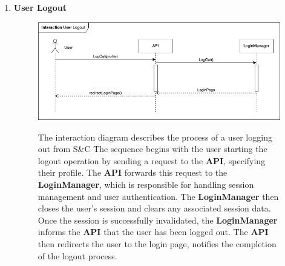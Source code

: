 \begin{enumerate}
    \newpage
    \item \textbf{User Logout}
    \begin{figure}[h!]
            \centering  \includegraphics[width=1\textwidth]{DD/Images/Interactions/INT02_UserLogout.drawio.png}
            \label{fig:ComponentViewDiagram}
            \caption*{The interaction diagram describes the process of a user logging out from S\&C The sequence begins with the user starting the logout operation by sending a request to the \textbf{API}, specifying their profile. The \textbf{API} forwards this request to the \textbf{LoginManager}, which is responsible for handling session management and user authentication. The \textbf{LoginManager} then closes the user's session and clears any associated session data. Once the session is successfully invalidated, the \textbf{LoginManager} informs the \textbf{API} that the user has been logged out. The \textbf{API} then redirects the user to the login page, notifies the completion of the logout process.
            }
    \end{figure}


\end{enumerate}
